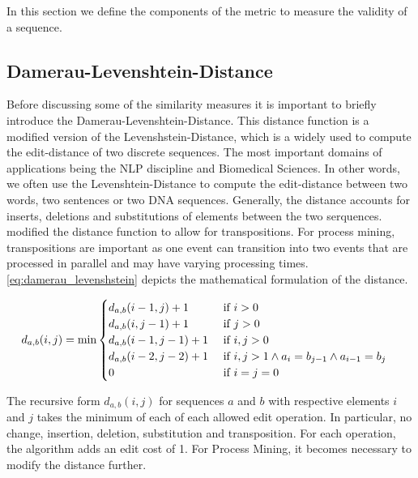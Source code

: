 \documentclass[./../../paper.tex]{subfiles}
\begin{document}
In this section we define the components of the metric to measure the validity of a sequence.

\subsection{Damerau-Levenshtein-Distance}
Before discussing some of the similarity measures it is important to briefly introduce the Damerau-Levenshtein-Distance. This distance function is a modified version of the Levenshstein-Distance\autocite{levenshtein_binary_1965}, which is a widely used to compute the edit-distance of two discrete sequences. The most important domains of applications being the \gls{NLP} discipline and Biomedical Sciences. In other words, we often use the Levenshtein-Distance to compute the edit-distance between two words, two sentences or two DNA sequences. Generally, the distance accounts for inserts, deletions and substitutions of elements between the two serquences.
\citeauthor{damerau_technique_1964} modified the distance function to allow for transpositions. For process mining, transpositions are important as one event can transition into two events that are processed in parallel and may have varying processing times. \autoref{eq:damerau_levenshstein} depicts the mathematical formulation of the distance.   

\begin{align}
    \label{eq:damerau_levenshstein}
    d_{a, b}(i, j) & =\min
    \begin{cases}
        d_{a, b}(i-1, j  )+ 1 & \text { if } i>0                                            \\
        d_{a, b}(i  , j-1)+ 1 & \text { if } j>0                                            \\
        d_{a, b}(i-1, j-1)+ 1 & \text { if } i, j>0                                         \\
        d_{a, b}(i-2, j-2)+ 1 & \text { if } i, j>1 \land a_{i}=b_{j-1} \land a_{i-1}=b_{j} \\
        0                                 & \text { if } i=j=0                                         
    \end{cases}        
\end{align}

The recursive form $d_{a, b}(i, j)$ for sequences $a$ and $b$ with respective elements $i$ and $j$ takes the minimum of each of each allowed edit operation. In particular, no change, insertion, deletion, substitution and transposition. For each operation, the algorithm adds an edit cost of 1. For Process Mining, it becomes necessary to modify the distance further. 
\end{document}
